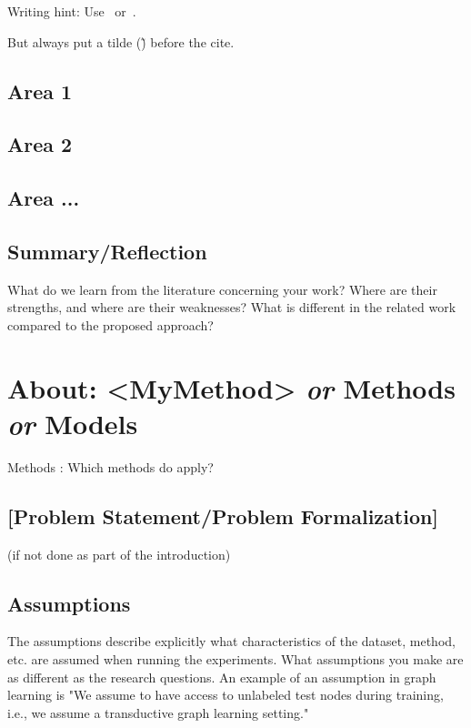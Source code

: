 \documentclass[manuscript, nonacm]{acmart}
\begin{document}
Writing hint:
%
Use~\cite{Abril07}
or~\citet{Abril07}.

But always put a tilde (\~) before the cite.

\subsection{Area 1}

\subsection{Area 2}

\subsection{Area ...}

\subsection{Summary/Reflection}

What do we learn from the literature concerning your work?
Where are their strengths, and where are their weaknesses?
What is different in the related work compared to the proposed approach?

\section{About: <MyMethod> \textit{or} Methods \textit{or} Models}
\label{sec:methods}

Methods : Which methods do apply?

\subsection{[Problem Statement/Problem Formalization]}
\label{sec:problemstatement}

(if not done as part of the introduction)

\subsection{Assumptions}

\begin{tcolorbox}
[title=Assumptions: What are assumptions?]
The assumptions describe explicitly what characteristics of the dataset, method, etc. are assumed when running the experiments. What assumptions you make are as different as the research questions. An example of an assumption in graph learning is "We assume to have access to unlabeled test nodes during training, i.e., we assume a transductive graph learning setting."
\end{tcolorbox}
\end{document}
